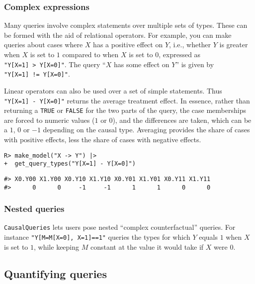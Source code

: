 \documentclass[
  11pt,
  article]{jss}
\begin{document}
\hypertarget{complex-expressions}{%
\subsubsection{Complex expressions}\label{complex-expressions}}

Many queries involve complex statements over multiple sets of types.
These can be formed with the aid of relational operators. For example,
you can make queries about cases where \(X\) has a positive effect on
\(Y\), i.e., whether \(Y\) is greater when \(X\) is set to \(1\)
compared to when \(X\) is set to \(0\), expressed as
\texttt{"Y{[}X=1{]}\ \textgreater{}\ Y{[}X=0{]}"}. The query ``\(X\) has
some effect on \(Y\)'' is given by
\texttt{"Y{[}X=1{]}\ !=\ Y{[}X=0{]}"}.

Linear operators can also be used over a set of simple statements. Thus
\texttt{"Y{[}X=1{]}\ -\ Y{[}X=0{]}"} returns the average treatment
effect. In essence, rather than returning a \texttt{TRUE} or
\texttt{FALSE} for the two parts of the query, the case memberships are
forced to numeric values (\(1\) or \(0\)), and the differences are
taken, which can be a \(1\), \(0\) or \(-1\) depending on the causal
type. Averaging provides the share of cases with positive effects, less
the share of cases with negative effects.

\begin{verbatim}
R> make_model("X -> Y") |> 
+  get_query_types("Y[X=1] - Y[X=0]")
\end{verbatim}

\begin{verbatim}
#> X0.Y00 X1.Y00 X0.Y10 X1.Y10 X0.Y01 X1.Y01 X0.Y11 X1.Y11 
#>      0      0     -1     -1      1      1      0      0
\end{verbatim}

\hypertarget{nested-queries}{%
\subsubsection{Nested queries}\label{nested-queries}}

\texttt{CausalQueries} lets users pose nested ``complex counterfactual''
queries. For instance \texttt{"Y{[}M=M{[}X=0{]},\ X=1{]}==1"} queries
the types for which \(Y\) equals \(1\) when \(X\) is set to \(1\), while
keeping \(M\) constant at the value it would take if \(X\) were \(0\).

\hypertarget{quantifying-queries}{%
\subsection{Quantifying queries}\label{quantifying-queries}}
\end{document}
